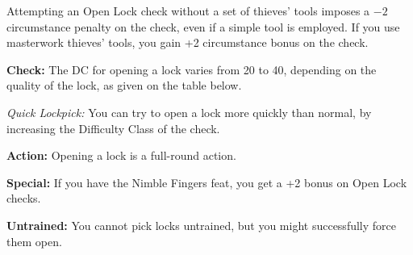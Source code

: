 Attempting an Open Lock check without a set of thieves' tools imposes a $-2$ circumstance penalty on the check, even if a simple tool is employed. If you use masterwork thieves' tools, you gain +2 circumstance bonus on the check.

\textbf{Check:} The DC for opening a lock varies from 20 to 40, depending on the quality of the lock, as given on the table below.


\textit{Quick Lockpick:} You can try to open a lock more quickly than normal, by increasing the Difficulty Class of the check.


\textbf{Action:} Opening a lock is a full-round action.

\textbf{Special:} If you have the Nimble Fingers feat, you get a +2 bonus on Open Lock checks.

\textbf{Untrained:} You cannot pick locks untrained, but you might successfully force them open.
